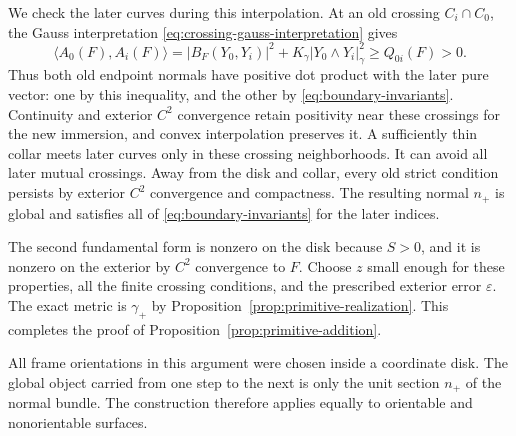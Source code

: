 We check the later curves during this interpolation.  At an old
crossing $C_i\cap C_0$, the Gauss interpretation
\eqref{eq:crossing-gauss-interpretation} gives
\begin{equation}
 \langle A_0(F),A_i(F)\rangle
 =|B_F(Y_0,Y_i)|^2+
 K_\gamma|Y_0\wedge Y_i|_\gamma^2
 \ge Q_{0i}(F)>0.
 \label{eq:old-pure-crossing-dot}
\end{equation}
Thus both old endpoint normals have positive dot product with the
later pure vector: one by this inequality, and the other by
\eqref{eq:boundary-invariants}.  Continuity and exterior $C^2$
convergence retain positivity near these crossings for the new
immersion, and convex interpolation preserves it.
A sufficiently thin collar meets later curves only in these crossing
neighborhoods.  It can avoid all later mutual crossings.
Away from the disk and collar, every old strict condition persists
by exterior $C^2$ convergence and compactness.  The resulting normal
$n_+$ is global and satisfies all of
\eqref{eq:boundary-invariants} for the later indices.

The second fundamental form is nonzero on the disk because $S>0$,
and it is nonzero on the exterior by $C^2$ convergence to $F$.
Choose $z$ small enough for these properties, all the finite crossing
conditions, and the prescribed exterior error $\varepsilon$.
The exact metric is $\gamma_+$ by
Proposition~\ref{prop:primitive-realization}.  This completes the
proof of Proposition~\ref{prop:primitive-addition}.

All frame orientations in this argument were chosen inside a
coordinate disk.  The global object carried from one step to the
next is only the unit section $n_+$ of the normal bundle.  The
construction therefore applies equally to orientable and
nonorientable surfaces.

